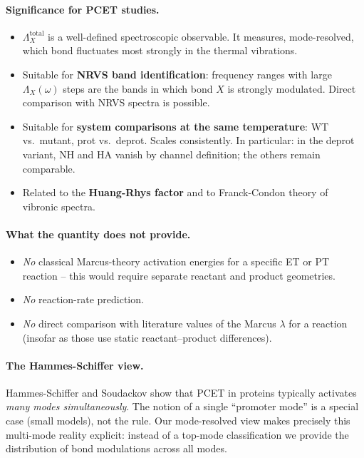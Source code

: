 \documentclass[11pt,a4paper,twoside]{article}
\theoremstyle{remark}
\begin{document}
\paragraph{Significance for PCET studies.}
\begin{itemize}\setlength{\itemsep}{0pt}
  \item $\Lambda_X^\text{total}$ is a well-defined spectroscopic
        observable. It measures, mode-resolved, which bond fluctuates
        most strongly in the thermal vibrations.
  \item Suitable for \textbf{NRVS band identification}: frequency
        ranges with large $\Lambda_X(\omega)$ steps are the bands
        in which bond $X$ is strongly modulated. Direct comparison
        with NRVS spectra is possible.
  \item Suitable for \textbf{system comparisons at the same
        temperature}: WT vs.\ mutant, prot vs.\ deprot. Scales
        consistently. In particular: in the deprot variant, NH
        and HA vanish by channel definition; the others remain
        comparable.
  \item Related to the \textbf{Huang-Rhys factor}
        \cite{HuangRhys1950} and to Franck-Condon theory of
        vibronic spectra.
\end{itemize}

\paragraph{What the quantity does not provide.}
\begin{itemize}\setlength{\itemsep}{0pt}
  \item \emph{No} classical Marcus-theory activation energies for
        a specific ET or PT reaction -- this would require
        separate reactant and product geometries.
  \item \emph{No} reaction-rate prediction.
  \item \emph{No} direct comparison with literature values of the
        Marcus $\lambda$ for a reaction (insofar as those use
        static reactant--product differences).
\end{itemize}

\paragraph{The Hammes-Schiffer view.}
Hammes-Schiffer and Soudackov \cite{HammesSchifferSoudackov2008}
show that PCET in proteins typically activates \emph{many modes
simultaneously}. The notion of a single ``promoter mode'' is a
special case (small models), not the rule. Our mode-resolved view
makes precisely this multi-mode reality explicit: instead of a
top-mode classification we provide the distribution of bond
modulations across all modes.
\end{document}
